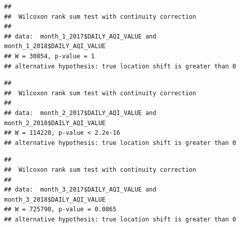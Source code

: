 \documentclass[12pt,]{article}
\newenvironment{Shaded}{\begin{snugshade}}{\end{snugshade}}
\newcommand{\KeywordTok}[1]{\textcolor[rgb]{0.13,0.29,0.53}{\textbf{#1}}}
\newcommand{\DataTypeTok}[1]{\textcolor[rgb]{0.13,0.29,0.53}{#1}}
\newcommand{\DecValTok}[1]{\textcolor[rgb]{0.00,0.00,0.81}{#1}}
\newcommand{\StringTok}[1]{\textcolor[rgb]{0.31,0.60,0.02}{#1}}
\newcommand{\OperatorTok}[1]{\textcolor[rgb]{0.81,0.36,0.00}{\textbf{#1}}}
\newcommand{\NormalTok}[1]{#1}
\begin{document}
\begin{Shaded}
\end{Shaded}

\begin{verbatim}
## 
##  Wilcoxon rank sum test with continuity correction
## 
## data:  month_1_2017$DAILY_AQI_VALUE and month_1_2018$DAILY_AQI_VALUE
## W = 30854, p-value = 1
## alternative hypothesis: true location shift is greater than 0
\end{verbatim}

\begin{Shaded}
\end{Shaded}

\begin{verbatim}
## 
##  Wilcoxon rank sum test with continuity correction
## 
## data:  month_2_2017$DAILY_AQI_VALUE and month_2_2018$DAILY_AQI_VALUE
## W = 114220, p-value < 2.2e-16
## alternative hypothesis: true location shift is greater than 0
\end{verbatim}

\begin{Shaded}
\end{Shaded}

\begin{verbatim}
## 
##  Wilcoxon rank sum test with continuity correction
## 
## data:  month_3_2017$DAILY_AQI_VALUE and month_3_2018$DAILY_AQI_VALUE
## W = 725790, p-value = 0.0865
## alternative hypothesis: true location shift is greater than 0
\end{verbatim}
\end{document}
